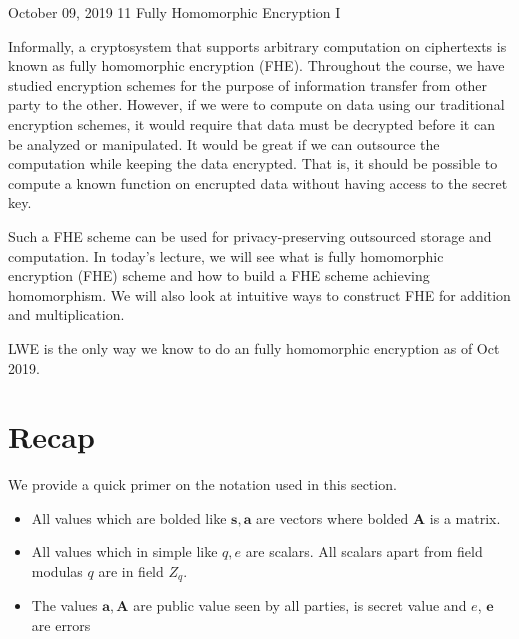 \documentclass[usletter]{article}
\begin{document}
	
           {October 09, 2019}                          %
           {11}                                       %
           {Fully Homomorphic Encryption I}  %

\newcommand{\floor}[1]{\left\lfloor #1 \right\rfloor}
\newcommand{\ceil}[1]{\left\lceil #1 \right\rceil}

Informally, a cryptosystem that supports arbitrary computation on ciphertexts is known as fully homomorphic encryption (FHE)\cite{wiki}. Throughout the course, we have studied encryption schemes for the purpose of information transfer from other party to the other. However, if we were to compute on data using our traditional encryption schemes, it would require that data must be decrypted before it can be analyzed or manipulated. It would be great if we can outsource the computation while keeping the data encrypted. That is, it should be possible to compute a known function on encrupted data without having access to the secret key. 

Such a FHE scheme can be used for privacy-preserving outsourced storage and computation. In today's lecture, we will see what is fully homomorphic encryption (FHE) scheme and how to build a FHE scheme achieving homomorphism. We will also look at intuitive ways to construct FHE for addition and multiplication.

\begin{fact}
LWE is the only way we know to do an fully homomorphic encryption as of Oct 2019. 
\end{fact}
           
\section{Recap}

We provide a quick primer on the notation used in this section. 
\begin{itemize}
	\item All values which are bolded like $\pmb{s}, \pmb{a}$ are vectors where bolded $\pmb{A}$ is a matrix.
	\item All values which in simple like $q, e$ are scalars. All scalars apart from field modulas $q$ are in field $Z_q$.
	\item The values $\pmb{a}, \pmb{A}$ are public value seen by all parties,  is secret value and $e$, $\pmb{e}$ are errors
\end{itemize}
\end{document}
